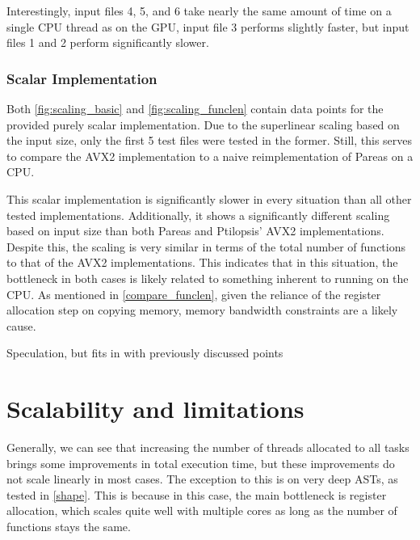 \documentclass[11pt,dvipsnames]{article}
\newcommand{\helpme}[1]{{\color{red}#1}}
\begin{document}
Interestingly, input files 4, 5, and 6 take nearly the same amount of time on a single CPU thread as on the GPU, input file 3 performs slightly faster, but input files 1 and 2 perform significantly slower.

\subsubsection{Scalar Implementation}
Both \autoref{fig:scaling_basic} and \autoref{fig:scaling_funclen} contain data points for the provided purely scalar implementation. Due to the superlinear scaling based on the input size, only the first 5 test files were tested in the former. Still, this serves to compare the AVX2 implementation to a naive reimplementation of Pareas on a CPU.

This scalar implementation is significantly slower in every situation than all other tested implementations. Additionally, it shows a significantly different scaling based on input size than both Pareas and Ptilopsis' AVX2 implementations. Despite this, the scaling is very similar in terms of the total number of functions to that of the AVX2 implementations. This indicates that in this situation, the bottleneck in both cases is likely related to something inherent to running on the CPU. As mentioned in \autoref{compare_funclen}, given the reliance of the register allocation step on copying memory, memory bandwidth constraints are a likely cause.

\helpme{Speculation, but fits in with previously discussed points}

\section{Scalability and limitations}
Generally, we can see that increasing the number of threads allocated to all tasks brings some improvements in total execution time, but these improvements do not scale linearly in most cases. The exception to this is on very deep ASTs, as tested in \autoref{shape}. This is because in this case, the main bottleneck is register allocation, which scales quite well with multiple cores as long as the number of functions stays the same.
\end{document}
